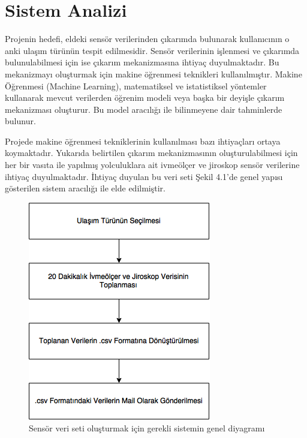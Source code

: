 \chapter{Sistem Analizi}

Projenin hedefi, eldeki sensör verilerinden çıkarımda bulunarak kullanıcının o anki ulaşım türünün tespit edilmesidir. Sensör verilerinin işlenmesi ve çıkarımda bulunulabilmesi için ise çıkarım mekanizmasına ihtiyaç duyulmaktadır. Bu mekanizmayı oluşturmak için makine öğrenmesi teknikleri kullanılmıştır. Makine Öğrenmesi (Machine Learning), matematiksel ve istatistiksel yöntemler kullanarak mevcut verilerden öğrenim modeli veya başka bir deyişle çıkarım mekanizması oluşturur. Bu model aracılığı ile bilinmeyene dair tahminlerde bulunur. 

Projede makine öğrenmesi tekniklerinin kullanılması bazı ihtiyaçları ortaya koymaktadır. Yukarıda belirtilen çıkarım mekanizmasının oluşturulabilmesi için her bir vasıta ile yapılmış yolculuklara ait ivmeölçer ve jiroskop sensör verilerine ihtiyaç duyulmaktadır. İhtiyaç duyulan bu veri seti Şekil 4.1'de genel yapısı gösterilen sistem aracılığı ile elde edilmiştir.

\begin{figure}[!htbp]
\centering
\includegraphics[scale=0.6]{projectChapters/images/genelakis.png}
\caption{Sensör veri seti oluşturmak için gerekli sistemin genel diyagramı}
\end{figure}


